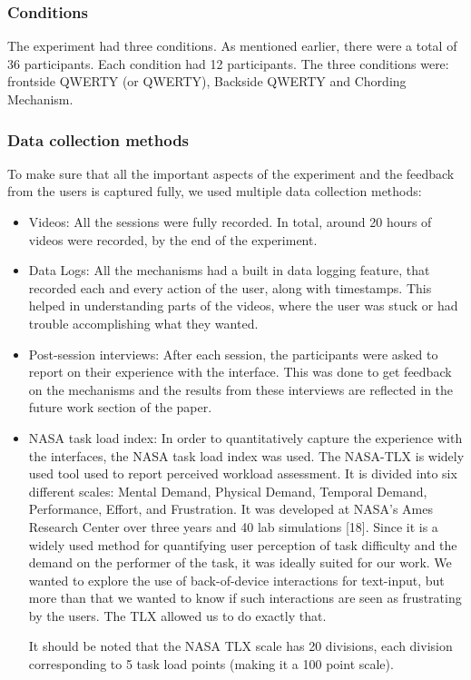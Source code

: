 \subsubsection{Conditions}

The experiment had three conditions. As mentioned earlier, there were a total of 36 participants. Each condition had 12 participants. The three conditions were: frontside QWERTY (or QWERTY), Backside QWERTY and Chording Mechanism.

\subsubsection{Data collection methods}

To make sure that all the important aspects of the experiment and the feedback from the users is captured fully, we used multiple data collection methods:

\begin{itemize}
\item Videos: All the sessions were fully recorded. In total, around 20 hours of videos were recorded, by the end of the experiment.
\item Data Logs: All the mechanisms had a built in data logging feature, that recorded each and every action of the user, along with timestamps. This helped in understanding parts of the videos, where the user was stuck or had trouble accomplishing what they wanted.
\item Post-session interviews: After each session, the participants were asked to report on their experience with the interface. This was done to get feedback on the mechanisms and the results from these interviews are reflected in the future work section of the paper. 
\item NASA task load index: In order to quantitatively capture the experience with the interfaces, the NASA task load index was used. The NASA-TLX is widely used tool used to report perceived workload assessment. It is divided into six different scales: Mental Demand, Physical Demand, Temporal Demand, Performance, Effort, and Frustration. It was developed at NASA's Ames Research Center over three years and 40 lab simulations [18]. Since it is a widely used method for quantifying user perception of task difficulty and the demand on the performer of the task, it was ideally suited for our work. We wanted to explore the use of back-of-device interactions for text-input, but more than that we wanted to know if such interactions are seen as frustrating by the users. The TLX allowed us to do exactly that. 

It should be noted that the NASA TLX scale has 20 divisions, each division corresponding to 5 task load points (making it a 100 point scale).

\end{itemize}
